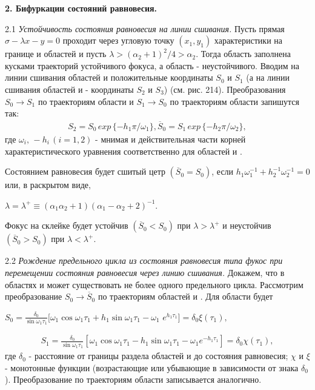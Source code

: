 \documentclass{article}
\newcommand{\RomanNumeralCaps}[1]
    {\MakeUppercase{\romannumeral #1}}
\begin{document}
\textbf{2. Бифуркации состояний равновесия.}

2.1 \textit{Устойчивость состояния равновесия на линии сшивания.}
Пусть прямая $\sigma - \lambda x - y = 0$ проходит через угловую точку
$(x_{1}, y_{1})$ характеристики на границе \RomanNumeralCaps{1} и \RomanNumeralCaps{2} областей и пусть
$\lambda > (\alpha_{2} + 1)^2/4>\alpha_{2}$. Тогда область \RomanNumeralCaps{1} заполнена кусками траекторий 
устойчивого фокуса, а область \RomanNumeralCaps{2} - неустойчивого. Вводим на 
линии сшивания областей \RomanNumeralCaps{1} и \RomanNumeralCaps{2} положительные координаты $S_{0}$ 
и $S_{1}$ (а на линии сшивания областей \RomanNumeralCaps{2} и \RomanNumeralCaps{3} - координаты $S_{2}$ и 
$S_{3}$) (см. рис. 214). Преобразования $S_{0} \rightarrow S_{1}$ по траекториям области
\RomanNumeralCaps{1} и $S_{1} \rightarrow S_{0}$ по траекториям области \RomanNumeralCaps{2} запишутся так:
\begin{gather}
S_{2}=S_{0} \, exp \, \{-h_{1}\pi/ \omega_{1}\}, \overline{S}_{0}=S_{1} \, exp \, \{-h_{2}\pi / \omega_{2}\},
\tag{2}
\end{gather}
где $\omega_{i}, \, -h_{i}  \, (i=1, 2)$ - мнимая и действительная части корней
характеристического уравнения соответственно для областей
\RomanNumeralCaps{1} и \RomanNumeralCaps{2}.

Состоянием равновесия будет сшитый цетр $(\overline{S}_{0}=S_{0})$, если 
$h_{1} \omega_{1}^{-1} + h_{2}^{-1} \omega_{2}^{-1}=0$ или, в раскрытом виде,
\begin{center}
$\lambda=\lambda^+ \equiv (\alpha_{1} \alpha_{2} + 1)(\alpha_{1} - \alpha_{2} + 2)^{-1}$.
\end{center}
Фокус на склейке будет устойчив $(\overline{S}_{0}<S_{0})$ при $\lambda > \lambda^+$ и неустойчив
$(\overline{S}_{0}>S_{0})$ при $\lambda<\lambda^+$.

2.2 \textit{Рождение предельного цикла из состояния равновесия типа
фукос при перемещении состояния равновесия через линию 
сшивания.} Докажем, что в областях \RomanNumeralCaps{1} и \RomanNumeralCaps{2} может существовать не более одного предельного цикла. Рассмотрим преобразование
$S_{0} \rightarrow \overline{S}_{0}$ по траекториям областей \RomanNumeralCaps{1} и \RomanNumeralCaps{2}. Для области \RomanNumeralCaps{1} будет
\begin{center}
$S_{0} = \frac{\delta_{0}}{\sin \omega_{1} \tau_{1}} [ \omega_{1} \cos \omega_{1} \tau_{1} + h_{1} \sin \omega_{1} \tau_{1} - \omega_{1} $
$e^{h_{1} \tau_{1}} ] = \delta_{0} \xi (\tau_{1}), $
\end{center}
\begin{gather}
S_{1} = \frac{\delta_{0}}{\sin \omega_{1} \tau_{1}} [ \omega_{1} \cos \omega_{1} \tau_{1} - h_{1} \sin \omega_{1} \tau_{1} - \omega_{1}e^{-h_{1} \tau_{1}} ] = \delta_{0} \chi (\tau_{1}),
\tag{3}
\end{gather}
где $\delta_{0}$ - расстояние от границы раздела областей \RomanNumeralCaps{1} и \RomanNumeralCaps{2} до состояния
равновесия; $\chi$ и $\xi$ - монотонные функции (возрастающие
или убывающие в зависимости от знака $\delta_{0}$). Преобразование 
по траекториям области \RomanNumeralCaps{2} записывается аналогично.
\end{document}

